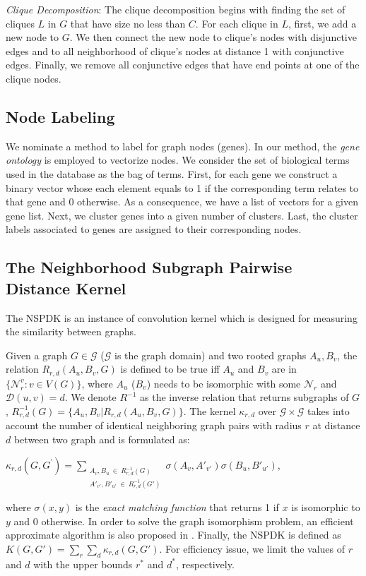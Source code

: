 \documentclass{esannV2}
\begin{document}
\textit{Clique Decomposition}: The clique decomposition begins with finding the set of cliques $L$ in $G$ that have size no less than $C$. For each clique in $L$, first, we add a new node to $G$. We then connect the new node to clique's nodes with disjunctive edges and to all neighborhood of clique's nodes at distance 1 with conjunctive edges. Finally, we remove all conjunctive edges that have end points at one of the clique nodes.

\subsection{Node Labeling}
We nominate a method to label for graph nodes (genes). In our method, the \textit{gene ontology} \cite{ontology} is employed to vectorize nodes. We consider the set of biological terms used in the database as the bag of terms. First, for each gene we construct a binary vector whose each element equals to 1 if the corresponding term relates to that gene and 0 otherwise. As a consequence, we have a list of vectors for a given gene list. Next, we cluster genes into a given number of clusters. Last, the cluster labels associated to genes are assigned to their corresponding nodes.


\subsection{The Neighborhood Subgraph Pairwise Distance Kernel}
The NSPDK is an instance of convolution kernel which is designed for measuring the similarity between graphs.

Given a graph $G \in \mathcal{G}$ ($\mathcal{G}$ is the graph domain) and two rooted graphs $A_u, B_v$, the relation $R_{r,d}(A_u, B_v, G)$ is defined to be true iff $A_u$ and $B_v$ are in $\lbrace \mathcal{N}_r^v: v \in V(G) \rbrace$, where $A_u$ ($B_v$) needs to be isomorphic with some $\mathcal{N}_r$ and $\mathcal{D}(u,v)= d$. We denote $R^{-1}$ as the inverse relation that returns subgraphs of $G$, $R^{-1}_{r,d}(G) = \lbrace A_u, B_v | R_{r,d}(A_u,B_v,G)\rbrace$. The kernel $\kappa_{r,d}$ over $\mathcal{G} \times \mathcal{G}$ takes into account the number of identical neighboring graph pairs with radius $r$ at distance $d$ between two graph and is formulated as:
\begin{center}
 $\kappa_{r,d}(G,G^{'}) = \sum\limits_{\substack{A_v, B_u \ \in \ R_{r,d}^{-1}(G) \\ {A'}_{v'}, {B'}_{u'} \ \in \ R_{r,d}^{-1}(G') }} { \sigma(A_v,A'_{v'})\sigma(B_u,B'_{u'}) }$,
\end{center}
where $\sigma(x,y)$ is the \textit{exact matching function} that returns 1 if $x$ is isomorphic to $y$ and 0 otherwise. In order to solve the graph isomorphism problem, an efficient approximate algorithm is also proposed in \cite{nspdk}. Finally, the NSPDK is defined as $K(G,G') = \sum\limits_{r}{\sum\limits_{d}{\kappa_{r,d}(G,G')}}$. For efficiency issue, we limit the values of $r$ and $d$ with the upper bounds $r^*$ and $d^*$, respectively.
\end{document}
